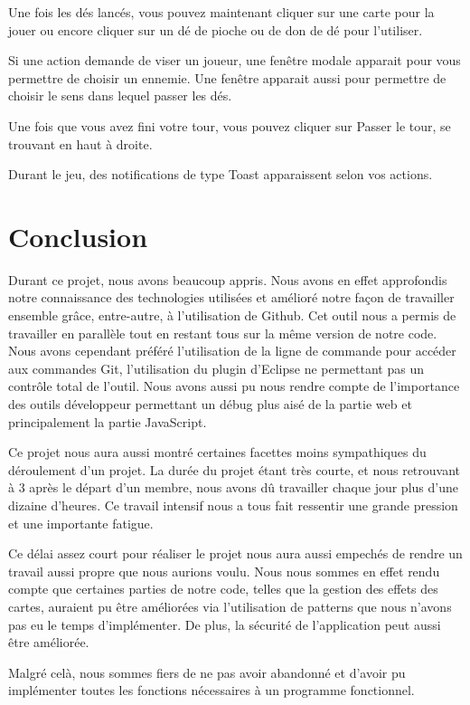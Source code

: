 \documentclass[11pt]{scrreprt}
\begin{document}
    Une fois les dés lancés, vous pouvez maintenant cliquer sur une carte pour la jouer ou encore cliquer sur un dé de pioche ou de don de dé pour l'utiliser.

    Si une action demande de viser un joueur, une fenêtre modale apparait pour vous permettre de choisir un ennemie. Une fenêtre apparait aussi pour permettre de choisir le sens dans lequel passer les dés.

    Une fois que vous avez fini votre tour, vous pouvez cliquer sur \og Passer le tour\fg{}, se trouvant en haut à droite.

    Durant le jeu, des notifications de type Toast apparaissent selon vos actions.

    \chapter{Conclusion}
    Durant ce projet, nous avons beaucoup appris. Nous avons en effet approfondis notre connaissance des technologies utilisées et amélioré notre façon de travailler ensemble grâce, entre-autre, à l'utilisation de Github. Cet outil nous a permis de travailler en parallèle tout en restant tous sur la même version de notre code. Nous avons cependant préféré l'utilisation de la ligne de commande pour accéder aux commandes Git, l'utilisation du plugin d'Eclipse ne permettant pas un contrôle total de l'outil. Nous avons aussi pu nous rendre compte de l'importance des \og outils développeur\fg{} permettant un débug plus aisé de la partie web et principalement la partie JavaScript.

    Ce projet nous aura aussi montré certaines facettes moins sympathiques du déroulement d'un projet. La durée du projet étant très courte, et nous retrouvant à 3 après le départ d'un membre, nous avons dû travailler chaque jour plus d'une dizaine d'heures. Ce travail intensif nous a tous fait ressentir une grande pression et une importante fatigue.

    Ce délai assez court pour réaliser le projet nous aura aussi empechés de rendre un travail aussi propre que nous aurions voulu. Nous nous sommes en effet rendu compte que certaines parties de notre code, telles que la gestion des effets des cartes, auraient pu être améliorées via l'utilisation de patterns que nous n'avons pas eu le temps d'implémenter. De plus, la sécurité de l'application peut aussi être améliorée.

    Malgré celà, nous sommes fiers de ne pas avoir abandonné et d'avoir pu implémenter toutes les fonctions nécessaires à un programme fonctionnel.
\end{document}
